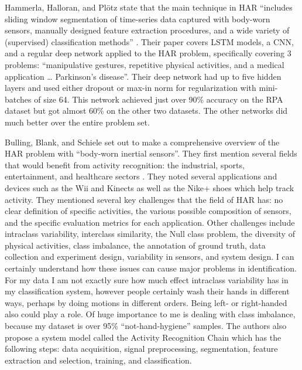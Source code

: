 \documentclass[]{report}
\begin{document}
Hammerla, Halloran, and Plötz state that the main technique in HAR “includes sliding window segmentation of time-series data captured with body-worn sensors, manually designed feature extraction procedures, and a wide variety of (supervised) classification methods” \cite{Hammerla}. Their paper covers LSTM models, a CNN, and a regular deep network applied to the HAR problem, specifically covering 3 problems: “manipulative gestures, repetitive physical activities, and a medical application … Parkinson’s disease”. Their deep network had up to five hidden layers and used either dropout or max-in norm for regularization with mini-batches of size 64. This network achieved just over 90\% accuracy on the RPA dataset but got almost 60\% on the other two datasets. The other networks did much better over the entire problem set.

Bulling, Blank, and Schiele set out to make a comprehensive overview of the HAR problem with “body-worn inertial sensors”. They first mention several fields that would benefit from activity recognition: the industrial, sports, entertainment, and healthcare sectors \cite{Bulling}. They noted several applications and devices such as the Wii and Kinects as well as the Nike+ shoes which help track activity. They mentioned several key challenges that the field of HAR has: no clear definition of specific activities, the various possible composition of sensors, and the specific evaluation metrics for each application. Other challenges include intraclass variability, interclass similarity, the Null class problem, the diversity of physical activities, class imbalance, the annotation of ground truth, data collection and experiment design, variability in sensors, and system design. I can certainly understand how these issues can cause major problems in identification. For my data I am not exactly sure how much effect intraclass variability has in my classification system, however people certainly wash their hands in different ways, perhaps by doing motions in different orders. Being left- or right-handed also could play a role. Of huge importance to me is dealing with class imbalance, because my dataset is over 95\% “not-hand-hygiene” samples. The authors also propose a system model called the Activity Recognition Chain which has the following steps: data acquisition, signal preprocessing, segmentation, feature extraction and selection, training, and classification.
\end{document}
